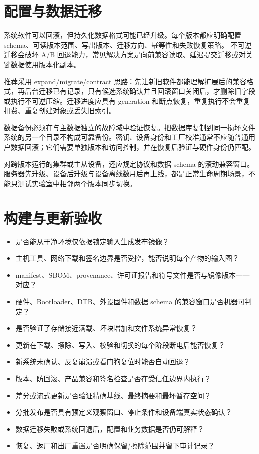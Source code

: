 \section{配置与数据迁移}

系统软件可以回滚，但持久化数据格式可能已经升级。每个版本都应明确配置 schema、可读版本范围、写出版本、迁移方向、幂等性和失败恢复策略。
不可逆迁移会破坏 A/B 回退能力，常见解决方案是向前兼容读取、延迟提交迁移或对关键数据使用版本化副本。

推荐采用 expand/migrate/contract 思路：先让新旧软件都能理解扩展后的兼容格式，再后台迁移已有记录，只有候选系统确认并且回滚窗口关闭后，才删除旧字段或执行不可逆压缩。迁移进度应具有 generation 和断点恢复，重复执行不会重复扣费、重复创建对象或丢失旧索引。

数据备份必须在与主数据独立的故障域中验证恢复。把数据库复制到同一损坏文件系统的另一个目录不构成可靠备份。密钥、设备身份和工厂校准通常不应随普通用户数据回滚；它们需要单独版本和访问控制，并在恢复后验证与硬件身份仍匹配。

对跨版本运行的集群或主从设备，还应规定协议和数据 schema 的滚动兼容窗口。服务器先升级、设备后升级与设备离线数月后再上线，都是正常生命周期场景，不能只测试实验室中相邻两个版本同步切换。

\section{构建与更新验收}

\begin{itemize}
  \item 是否能从干净环境仅依据锁定输入生成发布镜像？
  \item 主机工具、网络下载和签名边界是否受控，能否说明每个产物的输入图？
  \item manifest、SBOM、provenance、许可证报告和符号文件是否与镜像版本一一对应？
  \item 硬件、Bootloader、DTB、外设固件和数据 schema 的兼容窗口是否机器可判定？
  \item 是否验证了存储接近满载、坏块增加和文件系统异常恢复？
  \item 更新在下载、擦除、写入、校验和切换的每个阶段断电后能否恢复？
  \item 新系统未确认、反复崩溃或看门狗复位时能否自动回退？
  \item 版本、防回滚、产品兼容和签名检查是否在受信任边界内执行？
  \item 差分或流式更新是否验证精确基线、最终摘要和最坏暂存空间？
  \item 分批发布是否具有预定义观察窗口、停止条件和设备端真实状态确认？
  \item 数据迁移失败或系统回退后，配置和业务数据是否仍可解释？
  \item 恢复、返厂和出厂重置是否明确保留/擦除范围并留下审计记录？
\end{itemize}

